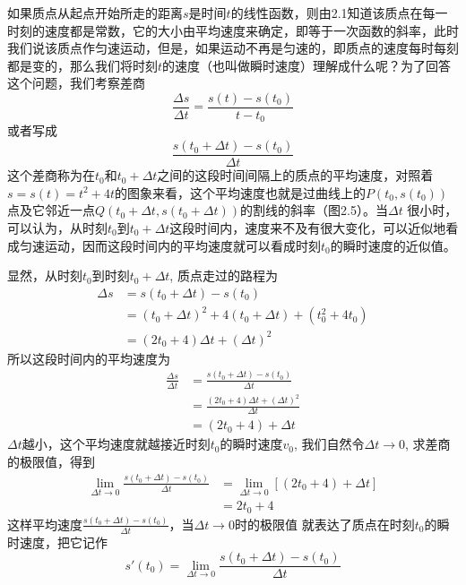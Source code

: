 \begin{analyze}
    如果质点从起点开始所走的距离$s$是时间$t$的线性函数，则由2.1知道该质点在每一时刻的速度都是常数，它的大小由平均速度来确定，即等于一次函数的斜率，此时我们说该质点作匀速运动，但是，如果运动不再是匀速的，即质点的速度每时每刻都是变的，那么我们将时刻$t$的速度（也叫做瞬时速度）理解成什么呢？为了回答这个问题，我们考察差商
\[\frac{\Delta s}{\Delta t}=\frac{s(t)-s(t_0)}{t-t_0}\]
或者写成\[\frac{s(t_0+\Delta t)-s(t_0)}{\Delta t}\]
这个差商称为在$t_0$和$t_0+\Delta t$之间的这段时间间隔上的质点的平均速度，对照着$s=s(t)=t^2+4t$的图象来看，这个平均速度也就是过曲线上的$P(t_0,s(t_0))$
点及它邻近一点$Q(t_0+\Delta t,s(t_0+\Delta t))$的割线的斜率（图2.5）。当$\Delta t$ 很小时，可以认为，从时刻$t_0$到$t_0+\Delta t$这段时间内，速度来不及有很大变化，可以近似地看成匀速运动，因而这段时间内的平均速度就可以看成时刻$t_0$的瞬时速度的近似值。

\begin{figure}[htp]
    \centering

    \caption{}
\end{figure}



显然，从时刻$t_0$到时刻$t_0+\Delta t$, 质点走过的路程为
\[\begin{split}
    \Delta s&=s(t_0+\Delta t)-s(t_0)\\
    &=(t_0+\Delta t)^2+4(t_0+\Delta t)+(t^2_0+4t_0)\\
    &=(2t_0+4)\Delta t+(\Delta t)^2
\end{split}\]
所以这段时间内的平均速度为
\[\begin{split}
    \frac{\Delta s}{\Delta t}&=\frac{s(t_0+\Delta t)-s(t_0)}{\Delta t}\\
    &=\frac{(2t_0+4)\Delta t+(\Delta t)^2}{\Delta t}\\
    &=(2t_0+4)+\Delta t
\end{split}\]
$\Delta t$越小，这个平均速度就越接近时刻$t_0$的瞬时速度$v_0$, 我们自然令$\Delta t\to 0$, 求差商的极限值，得到
\[\begin{split}
    \lim_{\Delta t\to 0}\frac{s(t_0+\Delta t)-s(t_0)}{\Delta t}&= \lim_{\Delta t\to 0}[(2t_0+4)+\Delta t]\\
    &=2t_0+4
\end{split}\]
这样平均速度$\frac{s(t_0+\Delta t)-s(t_0)}{\Delta t}$，当$\Delta t\to 0$时的极限值
就表达了质点在时刻$t_0$的瞬时速度，把它记作
\[s'(t_0)=   \lim_{\Delta t\to 0}\frac{s(t_0+\Delta t)-s(t_0)}{\Delta t}\]
\end{analyze}

